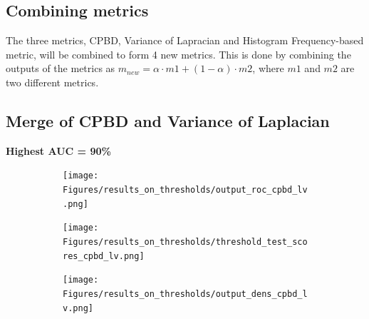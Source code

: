 \iffalse
\subsection{Combining metrics}
The three metrics, CPBD, Variance of Lapracian and Histogram Frequency-based metric, will be combined to form 4 new metrics. This is done by combining the outputs of the metrics as $m_{new}=\alpha \cdot m1 + (1-\alpha) \cdot m2$, where $m1$ and $m2$ are two different metrics.

\subsection{Merge of CPBD and Variance of Laplacian}
\textbf{Highest AUC = 90\%}
\begin{figure}[H]
    \centering
    \begin{subfigure}[t]{0.48\textwidth}
        \texttt{[image: Figures/results\_on\_thresholds/output\_roc\_cpbd\_lv.png]}
        \caption{}
        \label{fig:CPBD_LV_roc}
    \end{subfigure}\hspace{1em}
    \begin{subfigure}[t]{0.48\textwidth}
        \texttt{[image: Figures/results\_on\_thresholds/threshold\_test\_scores\_cpbd\_lv.png]}
        \caption{}
        \label{fig:CPBD_LV_thresh}
    \end{subfigure}\hspace{1em}
    \begin{subfigure}[t]{0.48\textwidth}
        \texttt{[image: Figures/results\_on\_thresholds/output\_dens\_cpbd\_lv.png]}
        \caption{}
        \label{fig:CPBD_LV_dens}
    \end{subfigure}\hspace{1em}
    \caption{}
    \label{fig:CPBD_LV_final}
\end{figure}

